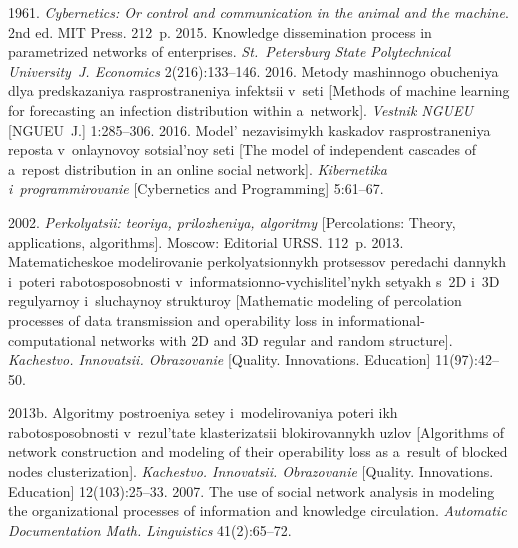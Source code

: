   \begin{multicols}{2}

\renewcommand{\bibname}{\protect\rmfamily References}

{\small\frenchspacing
 {%
 \begin{thebibliography}{99}
 
 1961. \textit{Cybernetics: Or control and communication in 
the animal and the machine}.
 2nd ed. MIT Press. 212~p.
 2015. 
Knowledge dissemination process in parametrized networks of enterprises. 
\textit{St.\ Petersburg State Polytechnical University~J. Economics}
2(216):133--146.
 2016. Metody ma\-shin\-no\-go obucheniya dlya pred\-ska\-za\-niya 
ras\-pro\-stra\-ne\-niya in\-fek\-tsii v~seti [Methods of machine learning for forecasting an 
infection distribution within a~network]. \textit{Vestnik NGUEU} [NGUEU~J.] 
1:285--306.
 2016. Model' ne\-za\-vi\-si\-mykh kas\-ka\-dov ras\-pro\-stra\-ne\-niya 
re\-pos\-ta v~on\-lay\-no\-voy so\-tsi\-al'\-noy seti [The model of independent cascades of 
a~repost distribution in an online social network]. \textit{Kibernetika 
i~programmirovanie} [Cybernetics and Programming] 5:61--67.

 2002. \textit{Perkolyatsii: teoriya, prilozheniya, algoritmy} 
[Percolations: Theory, applications, algorithms]. Moscow: Editorial URSS. 112~p.
 2013. Ma\-te\-ma\-ti\-che\-skoe 
mo\-de\-li\-ro\-va\-nie per\-ko\-lya\-tsi\-on\-nykh pro\-tses\-sov 
peredachi dan\-nykh i~poteri 
ra\-bo\-to\-spo\-sob\-nosti v~in\-for\-ma\-tsi\-on\-no-vy\-chis\-li\-tel'\-nykh setyakh s~2D 
i~3D re\-gu\-lyar\-noy i~slu\-chay\-noy struk\-tu\-roy [Mathematic modeling of percolation 
processes of data transmission and operability loss in informational-computational 
networks with 2D and 3D regular and random structure]. \textit{Kachestvo. 
Innovatsii. Obrazovanie} [Quality. Innovations. Education] 11(97):42--50.

 2013b. Algoritmy 
po\-stro\-eniya se\-tey i~mo\-de\-li\-ro\-va\-niya poteri ikh 
ra\-bo\-to\-spo\-sob\-nosti v~re\-zul'\-ta\-te 
klas\-te\-ri\-za\-tsii blo\-ki\-ro\-van\-nykh uz\-lov 
[Algorithms of network construction and 
modeling of their operability loss as a~result of blocked nodes clusterization]. 
\textit{Kachestvo. Innovatsii. Obrazovanie} [Quality. Innovations. Education] 
12(103):25--33. 
 2007. The use
of social network analysis in modeling the organizational
processes of 
 information and knowledge circulation.  
\textit{Automatic Documentation Math. Linguistics} 41(2):65--72.


\end{thebibliography}}}
\end{multicols}
